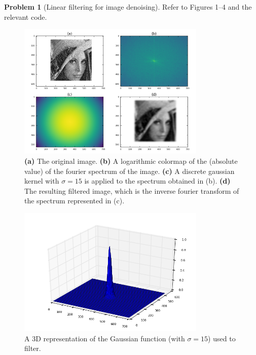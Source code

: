\documentclass[10pt]{article}
\theoremstyle{plain}
\theoremstyle{definition}
\newtheorem{prob}{Problem}
\numberwithin{equation}{section}
\begin{document}
\begin{prob}[Linear filtering for image denoising]
    Refer to Figures 1--4 and the relevant code.
     
\begin{figure}[p]
    \begin{center}
        \includegraphics[width=0.8\textwidth]{prob4}
        \caption{
            \textbf{(a)} The original image.
            \textbf{(b)} A logarithmic colormap of the (absolute value) of the fourier spectrum of the image.
            \textbf{(c)} A discrete gaussian kernel with $\sigma=15$ is applied to the spectrum obtained in (b).
            \textbf{(d)} The resulting filtered image, which is the inverse fourier transform of the spectrum
                         represented in (c).
                     }
    \end{center}
\end{figure}
\begin{figure}[p]
    \begin{center}
        \includegraphics[width=0.8\textwidth]{p4-gaussian15}
        \caption{A 3D representation of the Gaussian function (with $\sigma=15$) used to filter.}

\end{center}
\end{figure}
\end{prob}
\end{document}
